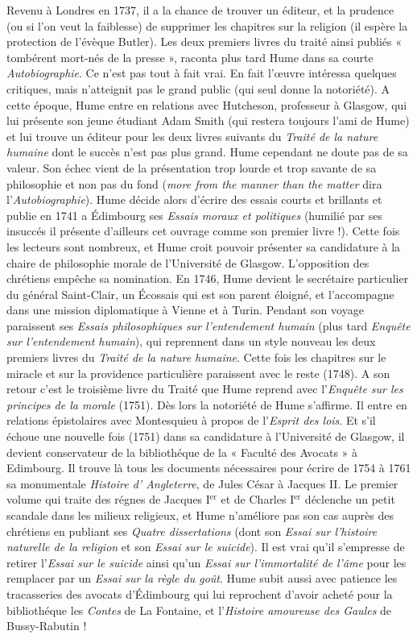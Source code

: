 Revenu à Londres en 1737, il a la chance de trouver
un éditeur, et la prudence (ou si l’on veut la faiblesse)
de supprimer les chapitres sur la religion
(il espère la protection de l’évèque Butler). Les deux
premiers livres du traité ainsi publiés « tombérent
mort-nés de la presse », raconta plus tard Hume dans
sa courte {\it Autobiographie}. Ce n’est pas tout à fait
vrai. En fait l’{\oe}uvre intéressa quelques critiques,
mais n’atteignit pas le grand public (qui seul donne
la notoriété). A cette époque, Hume entre en relations
avec Hutcheson, professeur à Glasgow, qui
lui présente son jeune étudiant Adam Smith (qui
restera toujours l’ami de Hume) et lui trouve un
éditeur pour les deux livres suivants du {\it Traité de
la nature humaine} dont le succès n’est pas plus
grand. Hume cependant ne doute pas de sa valeur.
Son échec vient de la présentation trop lourde et
trop savante de sa philosophie et non pas du fond
({\it more from the manner than the matter} dira l'{\it Autobiographie}).
Hume décide alors d’écrire des essais
courts et brillants et publie en 1741 a Édimbourg
ses {\it Essais moraux et politiques} (humilié par ses
insuccés il présente d’ailleurs cet ouvrage comme son
premier livre !). Cette fois les lecteurs sont nombreux,
et Hume croit pouvoir présenter sa candidature à
la chaire de philosophie morale de l’Université de
Glasgow. L’opposition des chrétiens empêche sa
nomination. En 1746, Hume devient le secrétaire
particulier du général Saint-Clair, un Écossais qui
est son parent éloigné, et l’accompagne dans une
mission diplomatique à Vienne et à Turin. Pendant
son voyage paraissent ses {\it Essais philosophiques sur
l'entendement humain} (plus tard {\it Enquête sur l’entendement
humain}), qui reprennent dans un style nouveau
les deux premiers livres du {\it Traité de la nature
humaine}. Cette fois les chapitres sur le miracle et
sur la providence particulière paraissent avec le
reste (1748). A son retour c’est le troisième livre du
Traité que Hume reprend avec l’{\it Enquête sur les
principes de la morale} (1751). Dès lors la notoriété
de Hume s’affirme. Il entre en relations épistolaires
avec Montesquieu à propos de l’{\it Esprit des lois}.
Et s'il échoue une nouvelle fois (1751) dans sa candidature
à l’Université de Glasgow, il devient conservateur
de la bibliothéque de la « Faculté des Avocats »
à Edimbourg. Il trouve là tous les documents
nécessaires pour écrire de 1754 à 1761 sa monumentale
{\it Histoire d’ Angleterre}, de Jules César à Jacques II.
Le premier volume qui traite des régnes de Jacques
I$^\text{er}$ et de Charles I$^\text{er}$ déclenche un petit scandale
dans les milieux religieux, et Hume n’améliore pas
son cas auprès des chrétiens en publiant ses {\it Quatre
dissertations} (dont son {\it Essai sur l'histoire naturelle
de la religion} et son {\it Essai sur le suicide}). Il est vrai
qu'il s’empresse de retirer l’{\it Essai sur le suicide}
ainsi qu’un {\it Essai sur l’immortalité de l’âme} pour les
remplacer par un {\it Essai sur la règle du goût}. Hume
subit aussi avec patience les tracasseries des avocats
d’Édimbourg qui lui reprochent d’avoir acheté
pour la bibliothéque les {\it Contes} de La Fontaine, et
l'{\it Histoire amoureuse des Gaules} de Bussy-Rabutin !

